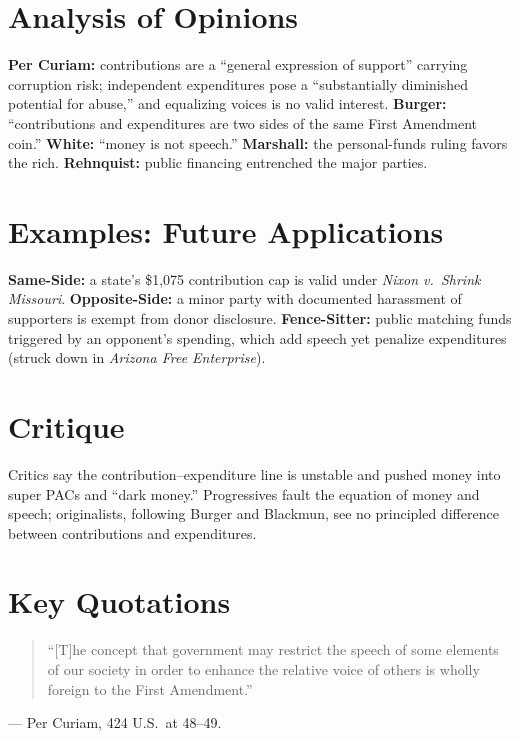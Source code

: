 \documentclass[12pt]{article}
\begin{document}
\section{Analysis of Opinions}
\textbf{Per Curiam:} contributions are a ``general expression of support'' carrying corruption risk; independent expenditures pose a ``substantially diminished potential for abuse,'' and equalizing voices is no valid interest. \textbf{Burger:} ``contributions and expenditures are two sides of the same First Amendment coin.'' \textbf{White:} ``money is not speech.'' \textbf{Marshall:} the personal-funds ruling favors the rich. \textbf{Rehnquist:} public financing entrenched the major parties.

\section{Examples: Future Applications}
\textbf{Same-Side:} a state's \$1,075 contribution cap is valid under \textit{Nixon v.\ Shrink Missouri}. \textbf{Opposite-Side:} a minor party with documented harassment of supporters is exempt from donor disclosure. \textbf{Fence-Sitter:} public matching funds triggered by an opponent's spending, which add speech yet penalize expenditures (struck down in \textit{Arizona Free Enterprise}).

\section{Critique}
Critics say the contribution--expenditure line is unstable and pushed money into super PACs and ``dark money.'' Progressives fault the equation of money and speech; originalists, following Burger and Blackmun, see no principled difference between contributions and expenditures.

\section{Key Quotations}
\begin{quote}
``[T]he concept that government may restrict the speech of some elements of our society in order to enhance the relative voice of others is wholly foreign to the First Amendment.''
\end{quote}
\noindent --- Per Curiam, 424 U.S.\ at 48--49.
\end{document}
